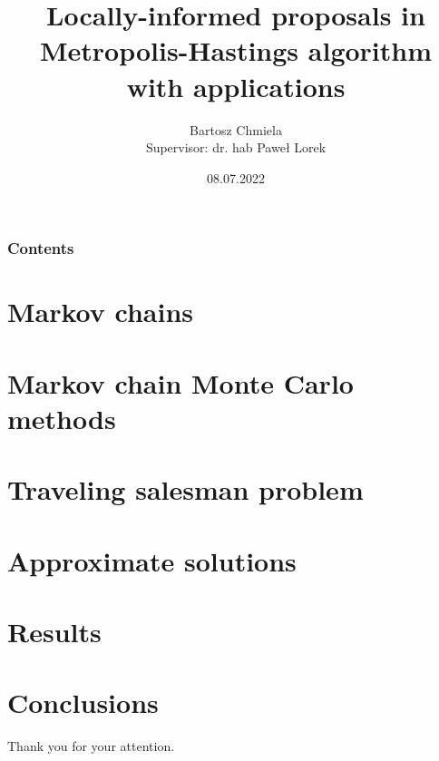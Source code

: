



\title[LIP]{Locally-informed proposals in Metropolis-Hastings algorithm with applications}
\author[B.Chmiela]{Bartosz Chmiela\\[10mm]{\small Supervisor: dr. hab Paweł Lorek}}
\date{08.07.2022}



	\begin{frame}
		\titlepage
	\end{frame}
	
	\begin{frame}
		\frametitle{Contents}
		\tableofcontents
	\end{frame}

	\section{Markov chains}
		
	
	\section[MCMC]{Markov chain Monte Carlo methods}
		
	
	\section[TSP]{Traveling salesman problem}
		
	
	\section{Approximate solutions}
		
	
	\section{Results}
		

	\section{Conclusions}
		
		
	
	\begin{frame}
		\centering
		Thank you for your attention.
	\end{frame}

	
